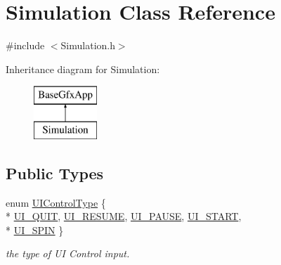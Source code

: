 \hypertarget{classSimulation}{\section{Simulation Class Reference}
\label{classSimulation}
}


{\ttfamily \#include $<$Simulation.\-h$>$}

Inheritance diagram for Simulation\-:\begin{figure}[H]
\begin{center}
\leavevmode
\includegraphics[height=2.000000cm]{classSimulation}
\end{center}
\end{figure}
\subsection*{Public Types}
\begin{DoxyCompactItemize}
\item 
enum \hyperlink{classSimulation_a0fd1c91d4e7699e893929d56b60a60bf}{U\-I\-Control\-Type} \{ \\*
\hyperlink{classSimulation_a0fd1c91d4e7699e893929d56b60a60bfa51f628c4a96a151830bd4a541dc42a5f}{U\-I\-\_\-\-Q\-U\-I\-T}, 
\hyperlink{classSimulation_a0fd1c91d4e7699e893929d56b60a60bfae8829fdccf0a3a28e0b0bf8dc47bf26e}{U\-I\-\_\-\-R\-E\-S\-U\-M\-E}, 
\hyperlink{classSimulation_a0fd1c91d4e7699e893929d56b60a60bfa6eb81d656b8ff64239548e4195560ef0}{U\-I\-\_\-\-P\-A\-U\-S\-E}, 
\hyperlink{classSimulation_a0fd1c91d4e7699e893929d56b60a60bfae4ec551adee29b6e2329929952c10ce5}{U\-I\-\_\-\-S\-T\-A\-R\-T}, 
\\*
\hyperlink{classSimulation_a0fd1c91d4e7699e893929d56b60a60bfa34512906ee0d0aafcd7f3257f738de15}{U\-I\-\_\-\-S\-P\-I\-N}
 \}
\begin{DoxyCompactList}\small\item\em the type of U\-I Control input. \end{DoxyCompactList}\end{DoxyCompactItemize}
